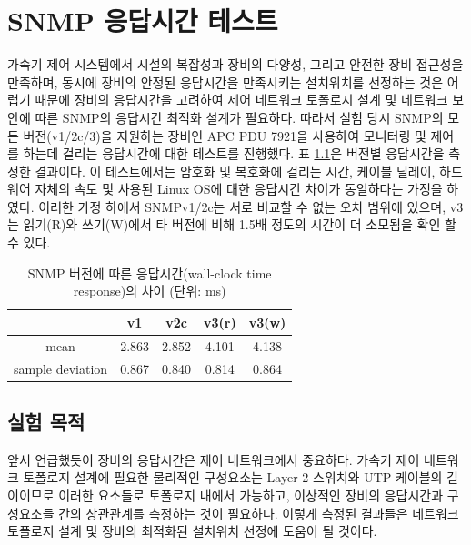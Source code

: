 \documentclass[11pt
  , a4paper
  , article
  , oneside
]{memoir}
\begin{document}
\clearpage

\chapter{SNMP 응답시간 테스트}

가속기 제어 시스템에서 시설의 복잡성과 장비의 다양성, 그리고 안전한 장비 접근성을 만족하며, 동시에 장비의 안정된 응답시간을 만족시키는 설치위치를 선정하는 것은 어렵기 때문에 장비의 응답시간을 고려하여 제어 네트워크 토폴로지 설계 및 네트워크 보안에 따른 SNMP의 응답시간 최적화 설계가 필요하다. 따라서 실험 당시 SNMP의 모든 버전(v1/2c/3)을 지원하는 장비인 APC PDU 7921을 사용하여 모니터링 및 제어를 하는데 걸리는 응답시간에 대한 테스트를 진행했다.
표 \ref{table:test}은 버전별 응답시간을 측정한 결과이다. 이 테스트에서는 암호화 및 복호화에 걸리는 시간, 케이블 딜레이, 하드웨어 자체의 속도 및 사용된 Linux OS에 대한 응답시간 차이가 동일하다는 가정을 하였다. 이러한 가정 하에서 SNMPv1/2c는 서로 비교할 수 없는 오차 범위에 있으며, v3는 읽기(R)와 쓰기(W)에서 타 버전에 비해 1.5배 정도의 시간이 더 소모됨을 확인 할 수 있다.

\begin{table}[h!]
\begin{center}
\begin{tabular}{c|c|c|c|c}\hline
 & v1 & v2c & v3(r) & v3(w) \\ \hline
mean & 2.863 & 2.852 & 4.101 & 4.138 \\ \hline
sample deviation & 0.867 & 0.840 & 0.814 & 0.864 \\ \hline
\end{tabular}
\caption{SNMP 버전에 따른 응답시간(wall-clock time response)의 차이 (단위: ms)}
  \label{table:test}  
\end{center}
\end{table}

\section{실험 목적}
앞서 언급했듯이 장비의 응답시간은 제어 네트워크에서 중요하다. 가속기 제어 네트워크 토폴로지 설계에 필요한 물리적인 구성요소는 Layer 2 스위치와 UTP 케이블의 길이이므로 이러한 요소들로 토폴로지 내에서 가능하고, 이상적인 장비의 응답시간과 구성요소들 간의 상관관계를 측정하는 것이 필요하다. 이렇게 측정된 결과들은 네트워크 토폴로지 설계 및 장비의 최적화된 설치위치 선정에 도움이 될 것이다.
\end{document}
